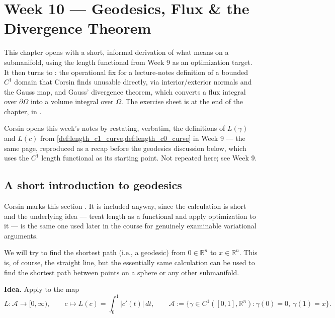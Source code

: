 \chapter{Week 10 --- Geodesics, Flux \& the Divergence Theorem}
\label{ch:week10}

This chapter opens with a short, informal derivation of what  means on a
submanifold, using the length functional from Week 9 as an optimization target. It then turns
to : the operational fix for a lecture-notes definition of a bounded $C^1$
domain that Corsin finds unusable directly, via interior/exterior normals and the Gauss map,
and Gauss' divergence theorem, which converts a flux integral over $\partial\Omega$ into a
volume integral over $\Omega$. The exercise sheet is at the end of the chapter, in
.

\begin{ainote}
Corsin opens this week's notes by restating, verbatim, the definitions of $L(\gamma)$ and
$L(c)$ from \cref{def:length_c1_curve,def:length_c0_curve} in Week 9 --- the same page,
reproduced as a recap before the geodesics discussion below, which uses the $C^1$ length
functional as its starting point. Not repeated here; see Week 9.
\end{ainote}

\section{A short introduction to geodesics}
\label{sec:geodesics}

\begin{ainote}
Corsin marks this section . It is included anyway, since the calculation
is short and the underlying idea --- treat length as a functional and apply optimization to it
--- is the same one used later in the course for genuinely examinable variational arguments.
\end{ainote}

We will try to find the shortest path (i.e., a geodesic) from $0 \in \mathbb{R}^n$ to $x \in \mathbb{R}^n$. This
is, of course, the straight line, but the essentially same calculation can be used to find the
shortest path between points on a sphere or any other submanifold.

\textbf{Idea.} Apply  to the map
\[L : \mathcal A \to [0,\infty), \qquad c \mapsto L(c) = \int_0^1 \lvert c'(t)\rvert\,dt,
  \qquad \mathcal A := \{\gamma \in C^1([0,1],\mathbb{R}^n) : \gamma(0)=0,\ \gamma(1)=x\}.\]

